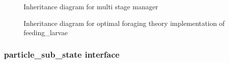 \begin{figure}[p]   %
\begin{center}                                                 
\end{center}                                                    
\caption{Inheritance diagram for multi stage manager}
\label{multistagemanager:fig}
\end{figure}
\begin{figure}[p]   %
\begin{center}                                                  
\end{center}                                                    
\caption{Inheritance diagram for optimal foraging theory implementation of
         feeding\_larvae}
\label{feedinglarvae:fig}
\end{figure}


\subsubsection{particle\_sub\_state interface} 

